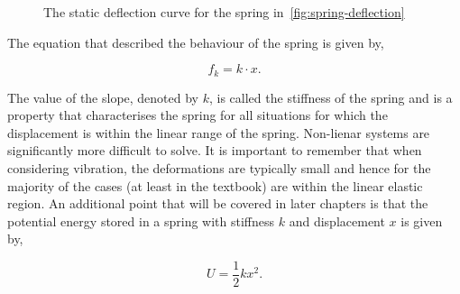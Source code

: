    \begin{figure}[h]
      \centering
      \caption{The static deflection curve for the spring in~\cref{fig:spring-deflection}}\label{fig:spring-deflection-curve}
    \end{figure}

    The equation that described the behaviour of the spring is given by,

    \begin{equation}
      f_{k} = k\cdot x.
    \end{equation}

    \noindent The value of the slope, denoted by $k$, is called the stiffness of the spring and is a property that characterises the spring for all situations for which the displacement is within the linear range of the spring. Non-lienar systems are significantly more difficult to solve. It is important to remember that when considering vibration, the deformations are typically small and hence for the majority of the cases (at least in the textbook) are within the linear elastic region. An additional point that will be covered in later chapters is that the potential energy stored in a spring with stiffness $k$ and displacement $x$ is given by,

    \begin{equation}
      U = \frac{1}{2}kx^2.
    \end{equation}


